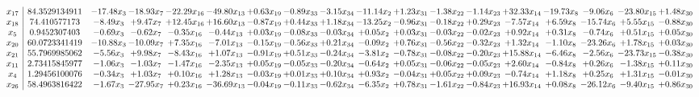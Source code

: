 \documentclass[9pt]{article}
\begin{document}
 \[\begin{array}{c| c c@{\hskip 2pt} c@{\hskip 2pt} c@{\hskip 2pt} c@{\hskip 2pt} c@{\hskip 2pt} c@{\hskip 2pt} c@{\hskip 2pt} c@{\hskip 2pt} c@{\hskip 2pt} c@{\hskip 2pt} c@{\hskip 2pt} c@{\hskip 2pt} c@{\hskip 2pt} c@{\hskip 2pt} c@{\hskip 2pt} c@{\hskip 2pt} }
 x_{17}   &  84.3529134911 & -17.48 x_{3} & -18.93 x_{7} & -22.29 x_{16} & -49.80 x_{13} & +  0.63 x_{19} & -0.89 x_{33} & -3.15 x_{34} & -11.14 x_{2} & +  1.23 x_{31} & -1.38 x_{22} & -1.14 x_{23} & + 32.33 x_{14} & -19.73 x_{8} & -9.06 x_{6} & -23.80 x_{15} & +  1.48 x_{30}\\
 x_{18}   &  74.410577173 & -8.49 x_{3} & +  9.47 x_{7} & + 12.45 x_{16} & + 16.60 x_{13} & -0.87 x_{19} & +  0.44 x_{33} & +  1.18 x_{34} & -13.25 x_{2} & -0.96 x_{31} & -0.18 x_{22} & +  0.29 x_{23} & -7.57 x_{14} & +  6.59 x_{8} & -15.74 x_{6} & +  5.55 x_{15} & -0.88 x_{30}\\
 x_{5}   &  0.9452307403 & -0.69 x_{3} & -0.62 x_{7} & -0.35 x_{16} & -0.44 x_{13} & +  0.03 x_{19} & -0.08 x_{33} & -0.03 x_{34} & +  0.05 x_{2} & +  0.03 x_{31} & -0.03 x_{22} & -0.02 x_{23} & +  0.92 x_{14} & +  0.31 x_{8} & -0.74 x_{6} & +  0.51 x_{15} & +  0.05 x_{30}\\
 x_{20}   &  60.0723341419 & -10.88 x_{3} & -10.09 x_{7} & +  7.35 x_{16} & -7.01 x_{13} & -0.15 x_{19} & -0.56 x_{33} & +  0.21 x_{34} & -0.09 x_{2} & +  0.76 x_{31} & -0.56 x_{22} & -0.32 x_{23} & +  1.32 x_{14} & -1.10 x_{8} & -23.26 x_{6} & +  1.78 x_{15} & +  0.03 x_{30}\\
 x_{21}   &  55.7969985062 & -5.56 x_{3} & +  9.98 x_{7} & -8.43 x_{16} & +  1.07 x_{13} & -0.91 x_{19} & +  0.51 x_{33} & -0.24 x_{34} & -3.81 x_{2} & -0.78 x_{31} & -0.08 x_{22} & -0.20 x_{23} & + 15.88 x_{14} & -6.46 x_{8} & -2.56 x_{6} & -23.73 x_{15} & -0.38 x_{30}\\
 x_{11}   &  2.73415845977 & -1.06 x_{3} & -1.03 x_{7} & -1.47 x_{16} & -2.35 x_{13} & +  0.05 x_{19} & -0.05 x_{33} & -0.20 x_{34} & -0.64 x_{2} & +  0.05 x_{31} & -0.06 x_{22} & -0.05 x_{23} & +  2.60 x_{14} & -0.84 x_{8} & +  0.26 x_{6} & -1.38 x_{15} & +  0.11 x_{30}\\
 x_{4}   &  1.29456100076 & -0.34 x_{3} & +  1.03 x_{7} & +  0.10 x_{16} & +  1.28 x_{13} & -0.03 x_{19} & +  0.01 x_{33} & +  0.10 x_{34} & +  0.93 x_{2} & -0.04 x_{31} & +  0.05 x_{22} & +  0.09 x_{23} & -0.74 x_{14} & +  1.18 x_{8} & +  0.25 x_{6} & +  1.31 x_{15} & -0.01 x_{30}\\
 x_{26}   &  58.4963816422 & -1.67 x_{3} & -27.95 x_{7} & +  0.23 x_{16} & -36.69 x_{13} & -0.04 x_{19} & -0.11 x_{33} & -0.62 x_{34} & -6.35 x_{2} & +  0.78 x_{31} & -1.61 x_{22} & -0.84 x_{23} & + 16.93 x_{14} & +  0.08 x_{8} & -26.12 x_{6} & -9.40 x_{15} & +  0.86 x_{30}\\

\end{array}\]
\end{document}
